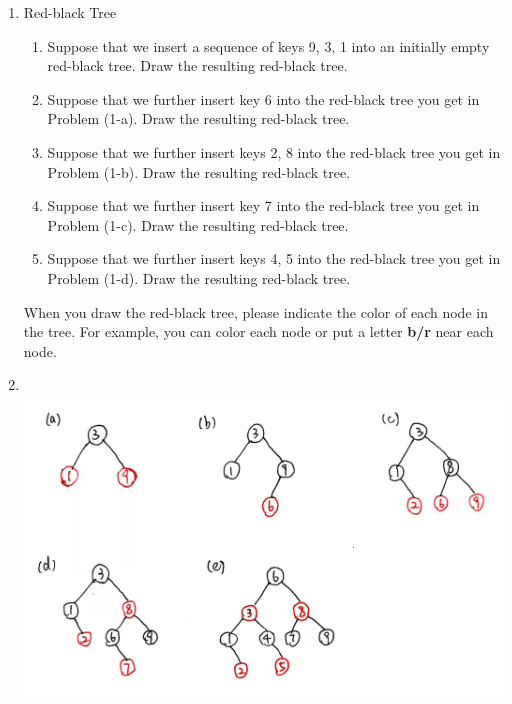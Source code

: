 \documentclass[12pt,a4paper]{article}
\makeatletter
\newtheorem*{solution}{Solution}
\theoremstyle{definition}
\renewenvironment{solution}[1][Solution] {\par\pushQED{\qed}\normalfont\topsep6\p@\@plus6\p@\relax\trivlist\item[\hskip\labelsep\bfseries#1\@addpunct{.}]\ignorespaces}{\popQED\endtrivlist\@endpefalse} \makeatother
\makeatother
\begin{document}
\begin{enumerate}

\item	Red-black Tree
	\begin{enumerate}
		\item Suppose that we insert a sequence of keys 9, 3, 1 into an initially empty red-black tree. Draw the resulting red-black tree.
		
		\item Suppose that we further insert key 6 into the red-black tree you get in Problem (1-a). Draw the resulting red-black tree.
		
		\item Suppose that we further insert keys 2, 8 into the red-black tree you get in Problem (1-b). Draw the resulting red-black tree.
		
		\item Suppose that we further insert key 7 into the red-black tree you get in Problem (1-c). Draw the resulting red-black tree.
		
		\item Suppose that we further insert keys 4, 5 into the red-black tree you get in Problem (1-d). Draw the resulting red-black tree.
		
	\end{enumerate}
	
	When you draw the red-black tree, please indicate the color of each node in the tree.
For example, you can color each node or put a letter \textbf{b/r} near each node.

\begin{solution}
\quad\\
\includegraphics[scale=0.17]{p1.jpg}
\end{solution}


\end{enumerate}
\end{document}
